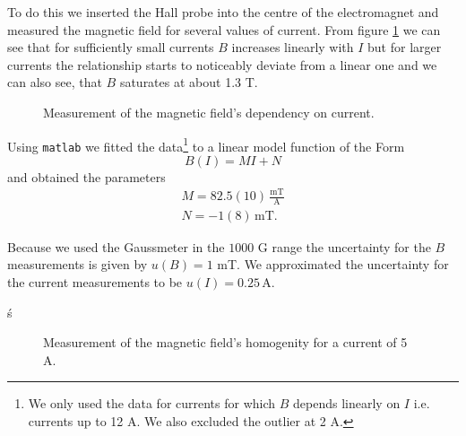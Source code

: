 To do this we inserted the Hall probe into the centre of the electromagnet and measured the magnetic field for several values of current. From figure \ref{fig:B_kalibration} we can see that for sufficiently small currents $B$ increases linearly with $I$ but for larger currents the relationship starts to noticeably deviate from a linear one and we can also see, that $B$ saturates at about 1.3 T. 
\begin{figure}[H]
	\centering
	\hspace*{-0.7cm}
	\caption{Measurement of the magnetic field's dependency on current. }
	\label{fig:B_kalibration}
\end{figure}
Using \texttt{matlab} we fitted the data\footnote{We only used the data for currents for which $B$ depends linearly on $I$ i.e. currents up to 12 A. We also excluded the outlier at 2 A.} to a linear model function of the Form
\begin{equation}
	B(I)=MI+N
\end{equation}
and obtained the parameters
\begin{gather}
M=82.5(10) \,\frac{\si{\milli\tesla}}{\si{\ampere}}\\
N=-1(8) \,\si{\milli\tesla}.
\end{gather}

Because we used the Gaussmeter in the $1000$ G range the uncertainty for the $B$ measurements is given by $u(B)=1$ \si{\milli\tesla}. We approximated the uncertainty for the current measurements to be $u(I)=0.25 \, \si{\ampere}$.

ś\begin{figure}[H]
	\centering
	\hspace*{-.5cm}
	\caption{Measurement of the magnetic field's homogenity  for a current of 5 A. }
	\label{fig:homogenitaet}
\end{figure}